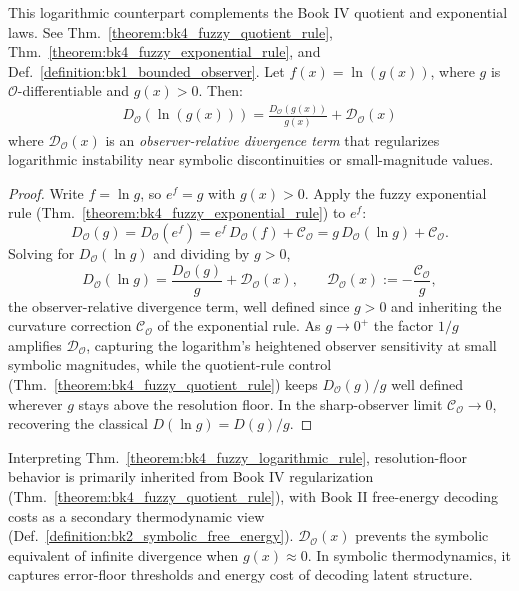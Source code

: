 \begin{theorem}
\label{theorem:bk4_fuzzy_logarithmic_rule}
This logarithmic counterpart complements the Book IV quotient and exponential laws.
See Thm.~\ref{theorem:bk4_fuzzy_quotient_rule}, Thm.~\ref{theorem:bk4_fuzzy_exponential_rule}, and Def.~\ref{definition:bk1_bounded_observer}.
Let $f(x) = \ln(g(x))$, where $g$ is $\mathcal{O}$-differentiable and $g(x) > 0$. Then:
\begin{align}
D_{\mathcal{O}}(\ln(g(x))) = \frac{D_{\mathcal{O}}(g(x))}{g(x)} + \mathcal{D}_{\mathcal{O}}(x)
\end{align}
where $\mathcal{D}_{\mathcal{O}}(x)$ is an \emph{observer-relative divergence term} that regularizes logarithmic instability near symbolic discontinuities or small-magnitude values.
\end{theorem}

\begin{proof}
\label{proof:bk4_fuzzy_logarithmic_rule}
\leavevmode
Write $f = \ln g$, so $e^{f} = g$ with $g(x) > 0$. Apply the fuzzy exponential rule (Thm.~\ref{theorem:bk4_fuzzy_exponential_rule}) to $e^{f}$:
\[
D_{\mathcal{O}}(g) = D_{\mathcal{O}}(e^{f}) = e^{f}\,D_{\mathcal{O}}(f) + \mathcal{C}_{\mathcal{O}} = g\,D_{\mathcal{O}}(\ln g) + \mathcal{C}_{\mathcal{O}}.
\]
Solving for $D_{\mathcal{O}}(\ln g)$ and dividing by $g > 0$,
\[
D_{\mathcal{O}}(\ln g) = \frac{D_{\mathcal{O}}(g)}{g} + \mathcal{D}_{\mathcal{O}}(x), \qquad \mathcal{D}_{\mathcal{O}}(x) := -\frac{\mathcal{C}_{\mathcal{O}}}{g},
\]
the observer-relative divergence term, well defined since $g > 0$ and inheriting the curvature correction $\mathcal{C}_{\mathcal{O}}$ of the exponential rule. As $g \to 0^{+}$ the factor $1/g$ amplifies $\mathcal{D}_{\mathcal{O}}$, capturing the logarithm's heightened observer sensitivity at small symbolic magnitudes, while the quotient-rule control (Thm.~\ref{theorem:bk4_fuzzy_quotient_rule}) keeps $D_{\mathcal{O}}(g)/g$ well defined wherever $g$ stays above the resolution floor. In the sharp-observer limit $\mathcal{C}_{\mathcal{O}} \to 0$, recovering the classical $D(\ln g) = D(g)/g$.
\end{proof}

\begin{scholium}
\label{scholium:bk4_fuzzy_logarithmic_resolution}
Interpreting Thm.~\ref{theorem:bk4_fuzzy_logarithmic_rule}, resolution-floor behavior is primarily inherited from Book IV regularization (Thm.~\ref{theorem:bk4_fuzzy_quotient_rule}), with Book II free-energy decoding costs as a secondary thermodynamic view (Def.~\ref{definition:bk2_symbolic_free_energy}).
$\mathcal{D}_{\mathcal{O}}(x)$ prevents the symbolic equivalent of infinite divergence when $g(x) \approx 0$. In symbolic thermodynamics, it captures error-floor thresholds and energy cost of decoding latent structure.
\end{scholium}



